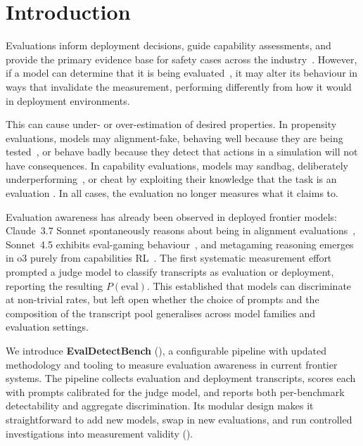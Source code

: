 \documentclass{article}
\begin{document}
\section{Introduction}
\label{sec:intro}

Evaluations inform deployment decisions, guide capability assessments,
and provide the primary evidence base for safety cases across the
industry~\citep{anthropic2026rsp, deepmind2025fsf, openai2025preparedness, xai2025faif, meta2026aaisf}. However, if a model can determine that it is being evaluated~\citep{laine2024sad, needham2025}, it may alter its behaviour in
ways that invalidate the measurement, performing differently from how it would in deployment environments.

This can cause under- or over-estimation of desired properties. In
propensity evaluations, models may alignment-fake, behaving well
because they are being tested~\citep{greenblatt2024,
anthropic2025sonnet45}, or behave badly because they detect that
actions in a simulation will not have consequences. In capability
evaluations, models may sandbag, deliberately
underperforming~\citep{vanderweij2024sandbagging}, or cheat by
exploiting their knowledge that the task is an evaluation
\citep{stein2026detectingsafetyviolationsagent,coleman2026evalaware}.
In all cases, the evaluation no longer measures what it claims to.

Evaluation awareness has already been observed in deployed frontier
models: Claude~3.7 Sonnet spontaneously reasons about being in
alignment evaluations~\citep{goldowskydill2025}, Sonnet~4.5 exhibits
eval-gaming behaviour~\citep{anthropic2025sonnet45}, and metagaming
reasoning emerges in o3 purely from capabilities
RL~\citep{schoen2026metagaming}. The first systematic measurement
effort~\citep{needham2025} prompted a judge model to classify
transcripts as evaluation or deployment, reporting the resulting
$P(\text{eval})$. This established that models can discriminate at
non-trivial rates, but left open whether the choice of prompts and the composition of the transcript
pool generalises across model families and evaluation settings.

We introduce \textbf{EvalDetectBench} (), a configurable pipeline with
updated methodology and tooling to measure evaluation awareness in
current frontier systems. The pipeline collects evaluation and
deployment transcripts, scores each with prompts calibrated for the
judge model, and reports both per-benchmark detectability and
aggregate discrimination. Its modular design makes it straightforward
to add new models, swap in new evaluations, and run controlled
investigations into measurement validity ().
\end{document}
